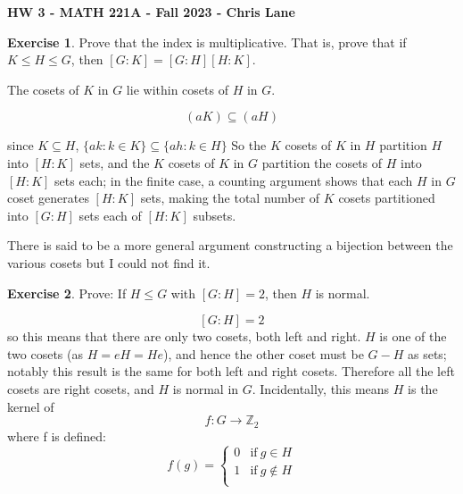 \documentclass[11pt,oneside]{article}
\numberwithin{equation}{section}
\theoremstyle{definition}
\newtheorem{exercise}{Exercise}
\def\ZZ{\mathbb{Z}}
\begin{document}
\textbf{HW 3 - MATH 221A - Fall 2023 - Chris Lane}

%   
\begin{exercise}
  Prove that the index is multiplicative. That is, prove that if $K \leq H \leq G$, then $[G:K] = [G:H][H:K]$. 
\end{exercise}
\begin{solution}
  The cosets of $K$ in $G$ lie within cosets of $H$ in $G$.

  $$
  (aK) \subseteq (aH)
  $$

  since $K \subseteq H$, $\{ ak : k \in K\} \subseteq \{ ah : k \in H\}$
  So the $K$ cosets of $K$ in $H$ partition $H$ into $[H:K]$ sets, and
  the $K$ cosets of $K$ in $G$ partition the cosets of $H$ into
  $[H:K]$ sets each; in the finite case, a counting argument shows
  that each $H$ in $G$ coset generates $[H:K]$ sets, making the total
  number of $K$ cosets partitioned into $[G:H]$ sets each of $[H:K]$
  subsets.

  There is said to be a more general argument constructing a bijection
  between the various cosets but I could not find it.
  
\end{solution}

\begin{exercise}
  Prove: If $H \leq G$ with $ [G:H] = 2$, then $H$ is normal. 
\end{exercise}
\begin{solution}
  $$ [G:H] = 2$$ so this means that there are only two cosets, both
  left and right.  $H$ is one of the two cosets (as $H = eH = He$),
  and hence the other coset must be $G - H$ as sets; notably this
  result is the same for both left and right cosets.  Therefore all
  the left cosets are right cosets, and $H$ is normal in $G$.
  Incidentally, this means $H$ is the kernel of
  $$
  f: G \to \ZZ_2
  $$
  where f is defined:
  $$
  f(g) = \begin{cases}
    0 & \text{if} \ g \in H  \\
    1 & \text{if} \ g \notin H \\
  \end{cases}
  $$
\end{solution}
\end{document}
